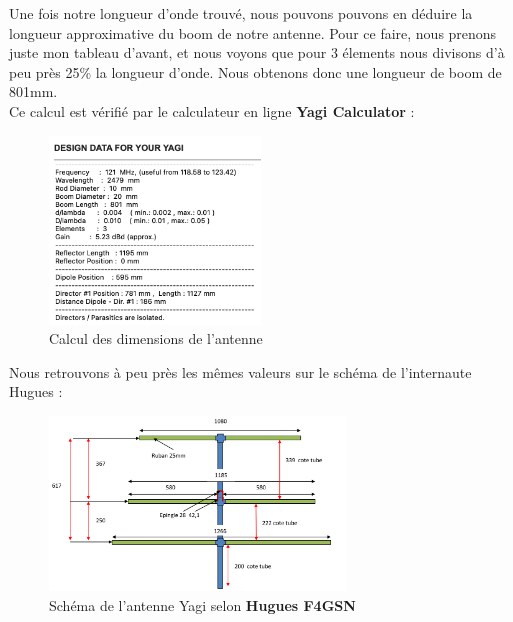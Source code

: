 \documentclass[12pt, a4paper]{article}
\begin{document}
\newpage
Une fois notre longueur d'onde trouvé, nous pouvons 
pouvons en déduire la longueur approximative du boom 
de notre antenne. Pour ce faire, nous prenons juste 
mon tableau d'avant, et nous voyons que pour 3 élements
nous divisons d'à peu près 25\% la longueur d'onde. Nous obtenons
donc une longueur de boom de 801mm.\\
Ce calcul est vérifié par le calculateur en ligne 
\textbf{Yagi Calculator} :
\begin{figure}[h]
    \centering
    \includegraphics[width=0.5\textwidth]{img/calc.png}
    \caption{Calcul des dimensions de l'antenne}
    \label{fig:calcul}
\end{figure}

Nous retrouvons à peu près les mêmes valeurs sur le schéma
de l'internaute Hugues :
\begin{figure}[h]
    \centering
    \includegraphics[width=0.7\textwidth]{img/boom.png}
    \caption{Schéma de l'antenne Yagi selon \textbf{Hugues F4GSN}}
    \label{fig:antenne}
\end{figure}
\end{document}
